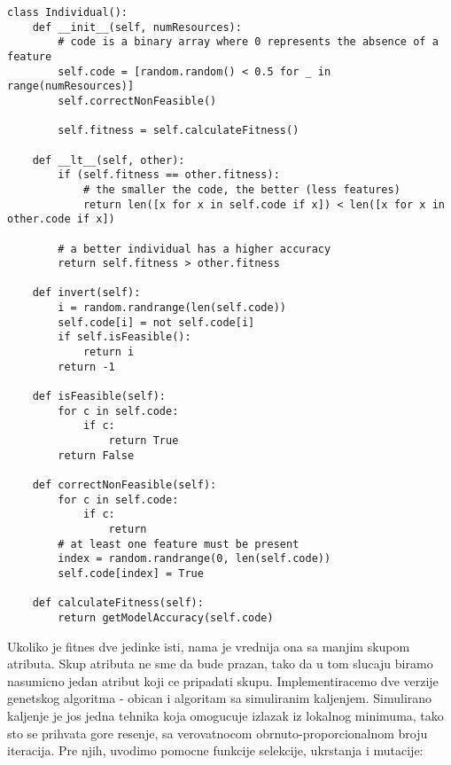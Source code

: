 \documentclass[11pt]{article} %
\begin{document}
\begin{lstlisting}
class Individual():
    def __init__(self, numResources):
        # code is a binary array where 0 represents the absence of a feature
        self.code = [random.random() < 0.5 for _ in range(numResources)]
        self.correctNonFeasible()
        
        self.fitness = self.calculateFitness()
        
    def __lt__(self, other):
        if (self.fitness == other.fitness):
            # the smaller the code, the better (less features)
            return len([x for x in self.code if x]) < len([x for x in other.code if x])
        
        # a better individual has a higher accuracy
        return self.fitness > other.fitness
        
    def invert(self):
        i = random.randrange(len(self.code))
        self.code[i] = not self.code[i]
        if self.isFeasible():
            return i
        return -1
    
    def isFeasible(self):
        for c in self.code:
            if c:
                return True
        return False
        
    def correctNonFeasible(self):
        for c in self.code:
            if c:
                return
        # at least one feature must be present
        index = random.randrange(0, len(self.code))
        self.code[index] = True
        
    def calculateFitness(self):
        return getModelAccuracy(self.code)
\end{lstlisting}

Ukoliko je fitnes dve jedinke isti, nama je vrednija ona sa manjim skupom atributa. Skup atributa ne sme da bude prazan, tako da u tom slucaju biramo nasumicno jedan atribut koji ce pripadati skupu.\newline
Implementiracemo dve verzije genetskog algoritma - obican i algoritam sa simuliranim kaljenjem. Simulirano kaljenje je jos jedna tehnika koja omogucuje izlazak iz lokalnog minimuma, tako sto se prihvata gore resenje, sa verovatnocom obrnuto-proporcionalnom broju iteracija.\newline
Pre njih, uvodimo pomocne funkcije selekcije, ukrstanja i mutacije:
\end{document}
